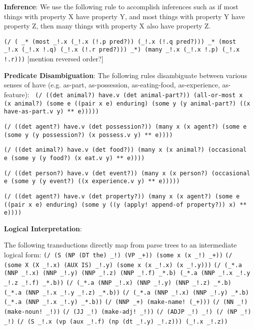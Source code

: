 \documentclass[11pt]{article}
\begin{document}
{\bf Inference}:
We use the following rule to accomplish inferences such as if most things with property X have property Y, and most things with property Y have property Z, then many things with property X also have property Z.

\texttt{(/ ( \_* (most \_!.x (\_!.x (!.p pred?)) (\_!.x (!.q pred?))) \_* (most \_!.x (\_!.x !.q) (\_!.x (!.r pred?))) \_*) (many \_!.x (\_!.x !.p) (\_!.x !.r)))}
[mention reversed order?]


{\bf Predicate Disambiguation}:
The following rules disambiguate between various senses of have (e.g. as-part, as-possession, as-eating-food, as-experience, as-feature):
\texttt{ (/ ((det animal?) have.v (det animal-part?))
              (all-or-most x (x animal?)
              (some e ((pair x e) enduring)
              (some y (y animal-part?)
              ((x have-as-part.v y) ** e)))))}

\texttt{(/ ((det agent?) have.v (det possession?))
       (many x (x agent?)
         (some e
           (some y (y possession?)
             (x possess.v y) ** e))))}

\texttt{(/ ((det animal?) have.v (det food?))
       (many x (x animal?)
         (occasional e
           (some y (y food?)
             (x eat.v y) ** e))))}

\texttt{(/ ((det person?) have.v (det event?))
       (many x (x person?)
         (occasional e
           (some y (y event?)
             ((x experience.v y) ** e)))))}

\texttt{(/ ((det agent?) have.v (det property?))
       (many x (x agent?)
         (some e ((pair x e) enduring)
           (some y
             ((y (apply! append-of property?)) x) ** e))))}

{\bf Logical Interpretation}:

The following transductions directly map from parse trees to an intermediate logical form:
\texttt{(/ (S (NP (DT the) \_!) (VP \_+)) (some x (x \_!) \_+))}
\texttt{(/ (some X (X \_!.x) (AUX IS) \_!.y) (some x (x \_!.x) (x \_!.y)))}
\texttt{(/ (\_*.a (NNP \_!.x) (NNP \_!.y) (NNP \_!.z) (NNP \_!.f) \_*.b) (\_*.a (NNP \_!.x \_!.y \_!.z \_!.f) \_*.b))}
\texttt{(/ (\_*.a (NNP \_!.x) (NNP \_!.y) (NNP \_!.z) \_*.b) (\_*.a (NNP \_!.x \_!.y \_!.z) \_*.b))}
\texttt{(/ (\_*.a (NNP \_!.x) (NNP \_!.y) \_*.b) (\_*.a (NNP \_!.x \_!.y) \_*.b))}
\texttt{(/ (NNP \_+) (make-name! (\_+)))}
\texttt{(/ (NN \_!) (make-noun! \_!))}
\texttt{(/ (JJ \_!) (make-adj! \_!))}
\texttt{(/ (ADJP \_!) \_!) (/ (NP \_!) \_!)}
\texttt{(/ (S \_!.x (vp (aux \_!.f) (np (dt \_!.y) \_!.z))) (\_!.x \_!.z))}
\end{document}
